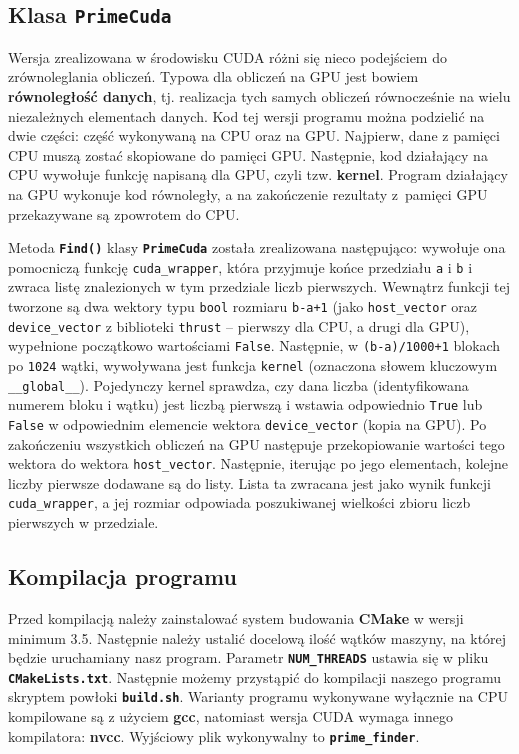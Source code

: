 \documentclass[12pt, twoside, hidelinks, a4paper]{article}
\begin{document}
\subsection{Klasa \textbf{\texttt{PrimeCuda}}}
Wersja zrealizowana w środowisku CUDA różni się nieco podejściem do zrównoleglania obliczeń. Typowa dla obliczeń na GPU jest bowiem \textbf{równoległość danych}, tj. realizacja tych samych obliczeń równocześnie na wielu niezależnych elementach danych.
Kod tej wersji programu można podzielić na dwie części: część wykonywaną na CPU oraz na GPU. Najpierw, dane z pamięci CPU muszą zostać skopiowane do pamięci GPU. Następnie, kod działający na CPU wywołuje funkcję napisaną dla GPU, czyli tzw. \textbf{kernel}. Program działający na GPU wykonuje kod równoległy, a na zakończenie rezultaty z~pamięci GPU przekazywane są zpowrotem do CPU.

Metoda \textbf{\texttt{Find()}} klasy \textbf{\texttt{PrimeCuda}} została zrealizowana następująco: wywołuje ona pomocniczą funkcję \texttt{cuda\_wrapper}, która przyjmuje końce przedziału \texttt{a} i \texttt{b} i zwraca listę znalezionych w tym przedziale liczb pierwszych. Wewnątrz funkcji tej tworzone są dwa wektory typu \texttt{bool} rozmiaru \texttt{b-a+1} (jako \texttt{host\_vector} oraz \texttt{device\_vector} z biblioteki \texttt{thrust} -- pierwszy dla CPU, a drugi dla GPU), wypełnione początkowo wartościami \texttt{False}. Następnie, w \texttt{(b-a)/1000+1} blokach po \texttt{1024} wątki, wywoływana jest funkcja \texttt{kernel} (oznaczona słowem kluczowym \texttt{\_\_global\_\_}). Pojedynczy kernel sprawdza, czy dana liczba (identyfikowana numerem bloku i wątku) jest liczbą pierwszą i wstawia odpowiednio \texttt{True} lub \texttt{False} w odpowiednim elemencie wektora \texttt{device\_vector} (kopia na GPU). Po zakończeniu wszystkich obliczeń na GPU następuje przekopiowanie wartości tego wektora do wektora \texttt{host\_vector}. Następnie, iterując po jego elementach, kolejne liczby pierwsze dodawane są do listy. Lista ta zwracana jest jako wynik funkcji \texttt{cuda\_wrapper}, a jej rozmiar odpowiada poszukiwanej wielkości zbioru liczb pierwszych w przedziale.

\subsection{Kompilacja programu}
Przed kompilacją należy zainstalować system budowania \textbf{CMake} w wersji minimum 3.5. Następnie należy ustalić docelową ilość wątków maszyny, na której będzie uruchamiany nasz program. Parametr \textbf{\texttt{NUM\_THREADS}} ustawia się w pliku \textbf{\texttt{CMakeLists.txt}}. Następnie możemy przystąpić do kompilacji naszego programu skryptem powłoki \textbf{\texttt{build.sh}}. Warianty programu wykonywane wyłącznie na CPU kompilowane są z użyciem \textbf{gcc}, natomiast wersja CUDA wymaga innego kompilatora: \textbf{nvcc}. Wyjściowy plik wykonywalny to \textbf{\texttt{prime\_finder}}.
\end{document}
